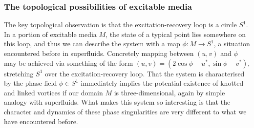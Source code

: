 \subsubsection{The topological possibilities of excitable media}

The key topological observation is that the excitation-recovery loop is a circle $S^1$. In a portion of excitable media $M$, the state of a typical point lies somewhere on this loop, and thus we can describe the system with a map $\phi : M \rightarrow S^1$, a situation encountered before in superfluids. Concretely mapping between $(u,v)$ and $\phi$ may be achieved via something of the form $(u,v) = (2 \cos \phi - u^*, \sin \phi - v^*)$, stretching $S^1$ over the excitation-recovery loop. That the system is characterised by the phase field $\phi \in S^1$ immediately implies the potential existence of knotted and linked vortices if our domain $M$ is three-dimensional, again by simple analogy with superfluids. What makes this system so interesting is that the character and dynamics of these phase singularities are very different to what we have encountered before. 

